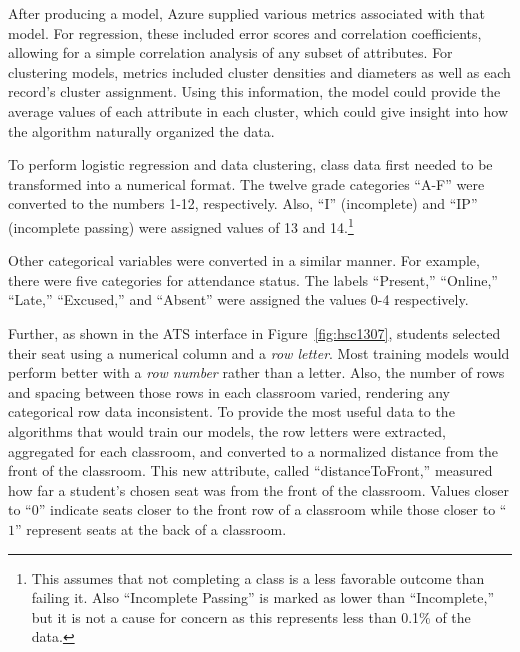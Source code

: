 After producing a model, Azure supplied various metrics associated with that model. For regression, these included error scores and correlation coefficients, allowing for a simple correlation analysis of any subset of attributes. For clustering models, metrics included cluster densities and diameters as well as each record's cluster assignment. Using this information, the model could provide the average values of each attribute in each cluster, which could give insight into how the algorithm naturally organized the data.

To perform logistic regression and data clustering, class data first needed to be transformed into a numerical format. The twelve grade categories ``A-F'' were converted to the numbers 1-12, respectively. Also, ``I'' (incomplete) and ``IP'' (incomplete passing) were assigned values of 13 and 14.\footnote{This assumes that not completing a class is a less favorable outcome than failing it. Also ``Incomplete Passing'' is marked as lower than ``Incomplete,'' but it is not a cause for concern as this represents less than 0.1\% of the data.}

Other categorical variables were converted in a similar manner. For example, there were five categories for attendance status. The labels ``Present,'' ``Online,'' ``Late,'' ``Excused,'' and ``Absent'' were assigned the values 0-4 respectively.

Further, as shown in the ATS interface in Figure~\ref{fig:hsc1307}, students selected their seat using a numerical column and a {\it row letter}. Most training models would perform better with a {\it row number} rather than a letter. Also, the number of rows and spacing between those rows in each classroom varied, rendering any categorical row data inconsistent. To provide the most useful data to the algorithms that would train our models, the row letters were extracted, aggregated for each classroom, and converted to a normalized distance from the front of the classroom. This new attribute, called ``distanceToFront,'' measured how far a student's chosen seat was from the front of the classroom. Values closer to ``$0$'' indicate seats closer to the front row of a classroom while those closer to ``$1$'' represent seats at the back of a classroom.

